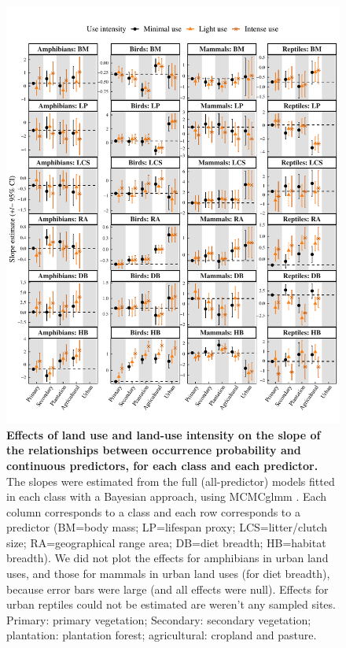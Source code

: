 \documentclass[11pt]{article}
\begin{document}


\begin{figure}[h!]
\centering
\includegraphics[scale=0.75]{Figures/Slopes_LU_mcmcglmm}
\caption[]{\textbf{Effects of land use and land-use intensity on the slope of the relationships between occurrence probability and continuous predictors, for each class and each predictor.} The slopes were estimated from the full (all-predictor) models fitted in each class with a Bayesian approach, using MCMCglmm \citep{MCMCglmm}. Each column corresponds to a class and each row corresponds to a predictor (BM=body mass; LP=lifespan proxy; LCS=litter/clutch size; RA=geographical range area; DB=diet breadth; HB=habitat breadth). We did not plot the effects for amphibians in urban land uses, and those for mammals in urban land uses (for diet breadth), because error bars were large (and all effects were null). Effects for urban reptiles could not be estimated are weren't any sampled sites. Primary: primary vegetation; Secondary: secondary vegetation; plantation: plantation forest; agricultural: cropland and pasture.}
\label{}
\end{figure}
\end{document}
